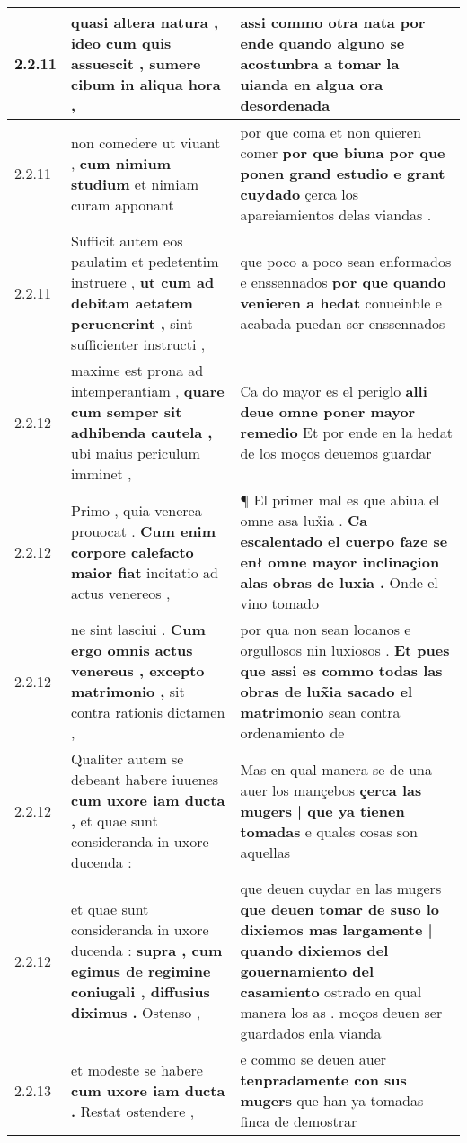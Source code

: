 \begin{tabular}{|p{1cm}|p{6.5cm}|p{6.5cm}|}
2.2.11 & quasi altera natura , \textbf{ ideo cum quis assuescit , } sumere cibum in aliqua hora , & assi commo otra nata \textbf{ por ende quando alguno se acostunbra a tomar la uianda } en algua ora desordenada \\\hline
2.2.11 & non comedere ut viuant , \textbf{ cum nimium studium } et nimiam curam apponant & por que coma et non quieren comer \textbf{ por que biuna por que ponen grand estudio e grant cuydado } çerca los apareiamientos delas viandas . \\\hline
2.2.11 & Sufficit autem eos paulatim et pedetentim instruere , \textbf{ ut cum ad debitam aetatem peruenerint , } sint sufficienter instructi , & que poco a poco sean enformados e enssennados \textbf{ por que quando venieren a hedat } conueinble e acabada puedan ser enssennados \\\hline
2.2.12 & maxime est prona ad intemperantiam , \textbf{ quare cum semper sit adhibenda cautela , } ubi maius periculum imminet , & Ca do mayor es el periglo \textbf{ alli deue omne poner mayor remedio } Et por ende en la hedat de los moços deuemos guardar \\\hline
2.2.12 & Primo , quia venerea prouocat . \textbf{ Cum enim corpore calefacto maior fiat } incitatio ad actus venereos , & ¶ El primer mal es que abiua el omne asa lux̉ia . \textbf{ Ca escalentado el cuerpo faze se enł omne mayor inclinaçion alas obras de luxia . } Onde el vino tomado \\\hline
2.2.12 & ne sint lasciui . \textbf{ Cum ergo omnis actus venereus , excepto matrimonio , } sit contra rationis dictamen , & por qua non sean locanos e orgullosos nin luxiosos . \textbf{ Et pues que assi es commo todas las obras de lux̃ia sacado el matrimonio } sean contra ordenamiento de \\\hline
2.2.12 & Qualiter autem se debeant habere iuuenes \textbf{ cum uxore iam ducta , } et quae sunt consideranda in uxore ducenda : & Mas en qual manera se de una auer los mançebos \textbf{ çerca las mugers | que ya tienen tomadas } e quales cosas son aquellas \\\hline
2.2.12 & et quae sunt consideranda in uxore ducenda : \textbf{ supra , cum egimus de regimine coniugali , diffusius diximus . } Ostenso , & que deuen cuydar en las mugers \textbf{ que deuen tomar de suso lo dixiemos mas largamente | quando dixiemos del gouernamiento del casamiento } ostrado en qual manera los as . moços deuen ser guardados enla vianda \\\hline
2.2.13 & et modeste se habere \textbf{ cum uxore iam ducta . } Restat ostendere , & e commo se deuen auer \textbf{ tenpradamente con sus mugers } que han ya tomadas finca de demostrar \\\hline

\end{tabular}
